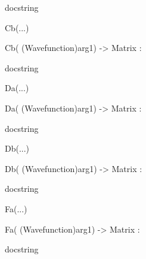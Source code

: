 \documentclass[letterpaper,10pt,english]{sphinxmanual}
\begin{document}
\begin{description}
\begin{description}
\begin{DUlineblock}{0em}
\begin{DUlineblock}{\DUlineblockindent}
\begin{DUlineblock}{\DUlineblockindent}
\item[] docstring
\item[] 
\end{DUlineblock}
\end{DUlineblock}
\item[] Cb(...)
\item[]
\begin{DUlineblock}{\DUlineblockindent}
\item[] Cb( (Wavefunction)arg1) -\textgreater{} Matrix :
\item[]
\begin{DUlineblock}{\DUlineblockindent}
\item[] docstring
\item[] 
\end{DUlineblock}
\end{DUlineblock}
\item[] Da(...)
\item[]
\begin{DUlineblock}{\DUlineblockindent}
\item[] Da( (Wavefunction)arg1) -\textgreater{} Matrix :
\item[]
\begin{DUlineblock}{\DUlineblockindent}
\item[] docstring
\item[] 
\end{DUlineblock}
\end{DUlineblock}
\item[] Db(...)
\item[]
\begin{DUlineblock}{\DUlineblockindent}
\item[] Db( (Wavefunction)arg1) -\textgreater{} Matrix :
\item[]
\begin{DUlineblock}{\DUlineblockindent}
\item[] docstring
\item[] 
\end{DUlineblock}
\end{DUlineblock}
\item[] Fa(...)
\item[]
\begin{DUlineblock}{\DUlineblockindent}
\item[] Fa( (Wavefunction)arg1) -\textgreater{} Matrix :
\item[]
\begin{DUlineblock}{\DUlineblockindent}
\item[] docstring
\item[] 

\end{DUlineblock}
\end{DUlineblock}
\end{DUlineblock}
\end{description}
\end{description}
\end{document}
